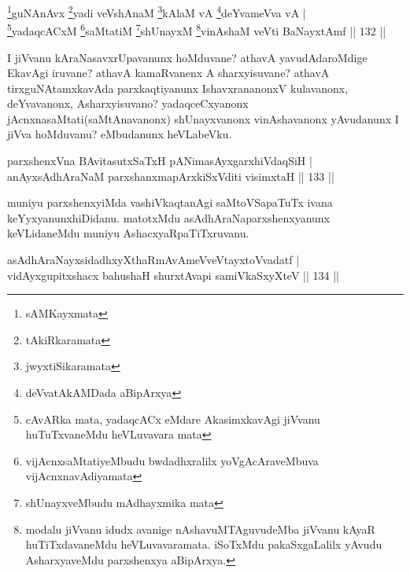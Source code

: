 \begin{shl}
\footnote{sAMKayxmata}guNAnAvx \footnote{tAkiRkaramata}yadi veVshAnaM \footnote{jwyxtiSikaramata}kAlaM vA \footnote{deVvatAkAMDada aBipArxya}deYvameVva vA |\\
\footnote{cAvARka mata, yadaqcACx eMdare AkasimxkavAgi jiVvanu huTuTxvaneMdu heVLuvavara mata}yadaqcACxM \footnote{vijAcnxsaMtatiyeMbudu bwdadhxralilx yoVgAcAraveMbuva vijAcnxnavAdiyamata}saMtatiM \footnote{shUnayxveMbudu mAdhayxmika mata}shUnayxM \footnote{modalu jiVvanu idudx avanige nAshavuMTAguvudeMba jiVvanu kAyaR huTiTxdava\-\break neMdu heVLuvavaramata. iSoTxMdu pakaSxgaLalilx yAvudu AsharxyaveMdu parxshenxya aBipArxya.}vinAshaM veVti BaNayxtAmf \hfill || 132 ||
\end{shl}

\begin{artha}
I jiVvanu kAraNasavxrUpavanunx hoMduvane? athavA yavudAdaroMdige EkavAgi iruvane? athavA kamaRvanenx A sharxyisuvane? athavA tirxguNAtamxkavAda parxkaqtiyanunx IshavxrananonxV kulavanonx, deYvavanonx, Asharxyisuvano? yadaqceCxyanonx jAcnxnasaMtati(saMtAnavanonx) shUnayxvanonx vinAshavanonx yAvudanunx I jiVva hoMduvanu? eMbudanunx heVLabeVku.
\end{artha}


\begin{shl}
parxshenxVna BAvitasutxSaTxH pANimasAyxgarxhiVdaqSiH |\\
anAyxsAdhAraNaM parxshanxmapArxkiSxVditi visimxtaH \hfill || 133 ||
\end{shl}

\begin{artha}
muniyu parxshenxyiMda vashiVkaqtanAgi saMtoVSapaTuTx ivana keYyxyanunx\break hiDidanu. matotxMdu asAdhAraNaparxshenxyanunx keVLidaneMdu muniyu AshacxyaRpaTiTxruvanu.
\end{artha}

\begin{shl}
asAdhAraNayxsidadhxyXthaRmAvAmeVveVtayxtoV\s vadatf |\\
vidAyxgupitxshacx bahushaH shurxtAvapi samiVkaSxyXteV \hfill || 134 ||
\end{shl}

